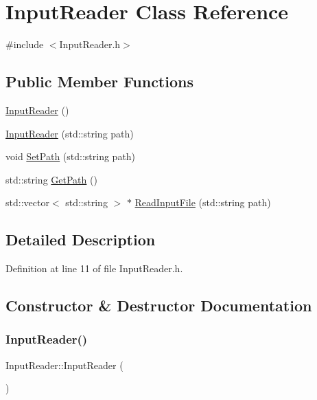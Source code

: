 \hypertarget{classInputReader}{}\section{Input\+Reader Class Reference}
\label{classInputReader}


{\ttfamily \#include $<$Input\+Reader.\+h$>$}

\subsection*{Public Member Functions}
\begin{DoxyCompactItemize}
\item 
\hyperlink{classInputReader_ae7d7eaec9edd0b8a5e6c5870f23070c3}{Input\+Reader} ()
\item 
\hyperlink{classInputReader_a213700cd8c4b1ed213bf778b7e43b891}{Input\+Reader} (std\+::string path)
\item 
void \hyperlink{classInputReader_a7b83b6aef68762bfc59a9958c4768da7}{Set\+Path} (std\+::string path)
\item 
std\+::string \hyperlink{classInputReader_a159a88dc2d5dbf63923c137636ed2941}{Get\+Path} ()
\item 
std\+::vector$<$ std\+::string $>$ $\ast$ \hyperlink{classInputReader_ad16dc3ebc228f45257b9ad4c3f62ed14}{Read\+Input\+File} (std\+::string path)
\end{DoxyCompactItemize}


\subsection{Detailed Description}


Definition at line 11 of file Input\+Reader.\+h.



\subsection{Constructor \& Destructor Documentation}
\mbox{\label{classInputReader_ae7d7eaec9edd0b8a5e6c5870f23070c3}} 
\subsubsection{\texorpdfstring{Input\+Reader()}{InputReader()}\hspace{0.1cm}{\footnotesize\ttfamily [1/2]}}
{\footnotesize\ttfamily Input\+Reader\+::\+Input\+Reader (\begin{DoxyParamCaption}{ }\end{DoxyParamCaption})}



